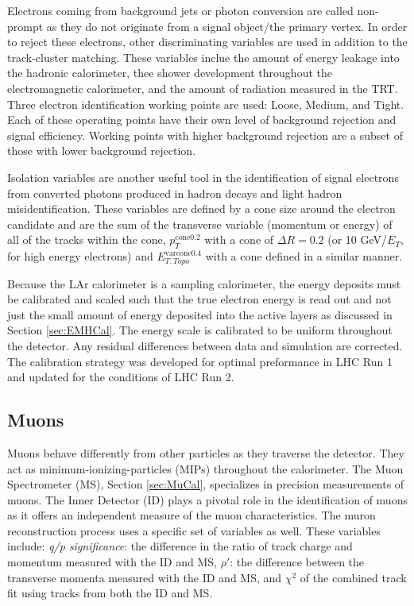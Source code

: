 Electrons coming from background jets or photon conversion are called non-prompt as they do not originate from a signal object/the primary vertex.  In order to reject these electrons, other discriminating variables are used in addition to the track-cluster matching.  These variables inclue the amount of energy leakage into the hadronic calorimeter, thee shower development throughout the electromagnetic calorimeter, and the amount of radiation measured in the TRT.  Three electron identification working points are used: Loose, Medium, and Tight.  Each of these operating points have their own level of background rejection and signal efficiency.  Working points with higher background rejection are a subset of those with lower background rejection.

Isolation variables are another useful tool in the identification of signal electrons from converted photons produced in hadron decays and light hadron misidentification.  These variables are defined by a cone size around the electron candidate and are the sum of the transverse variable (momentum or energy) of all of the tracks within the cone, $p_{T}^{\text{cone0.2}}$ with a cone of $\Delta R =0.2$ (or 10 GeV/$E_T$, for high energy electrons) and $E_{T, Topo}^{\text{varcone0.4}}$ with a cone defined in a similar manner.  

Because the LAr calorimeter is a sampling calorimeter, the energy deposits must be calibrated and scaled such that the true electron energy is read out and not just the small amount of energy deposited into the active layers as discussed in Section \ref{sec:EMHCal}.  The energy scale is calibrated to be uniform throughout the detector.  Any residual differences between data and simulation are corrected.  The calibration strategy was developed for optimal preformance in LHC Run 1\cite{ElectronCalib1} and updated for the conditions of LHC Run 2\cite{ElectronCalib2}.

\subsection{Muons}
Muons behave differently from other particles as they traverse the detector.  They act as minimum-ionizing-particles (MIPs) throughout the calorimeter.  The Muon Spectrometer (MS), Section \ref{sec:MuCal}, specializes in precision measurements of muons.  The Inner Detector (ID) plays a pivotal role in the identification of muons as it offers an independent measure of the muon characteristics.  The muron reconstruction process uses a specific set of variables as well\cite{MuonID}.  These variables include: \textit{ q/p significance}: the difference in the ratio of track charge and momentum measured with the ID and MS, $\rho'$: the difference between the transverse momenta measured with the ID and MS, and $\chi^2$ of the combined track fit using tracks from both the ID and MS.

